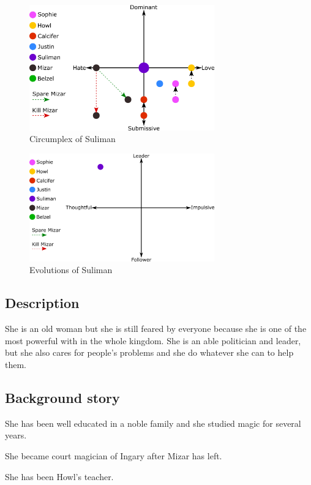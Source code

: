 \begin{figure}[H]
  \centering
  \includegraphics[width=8cm]{Images/Circumplexes/sulimanCircumplex}
  \caption{Circumplex of Suliman}
\end{figure}

\begin{figure}[H]
  \centering
   \includegraphics[width=8cm]{Images/Evolutions/sulimanEvolution}
  \caption{Evolutions of Suliman}
\end{figure}

\subsection{Description}
She is an old woman but she is still feared by everyone because she is one of the most powerful with in the whole kingdom. She is an able politician and leader, but she also cares for people's problems and she do whatever she can to help them.

\subsection{Background story}
She has been well educated in a noble family and she studied magic for several years.

She became court magician of Ingary after Mizar has left.

She has been Howl’s teacher.
